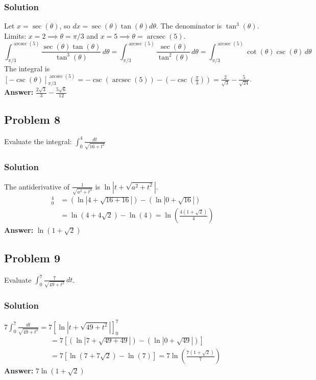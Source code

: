 \documentclass{article}
\begin{document}
\subsubsection*{Solution}
Let $ x = \sec(\theta) $, so $ dx = \sec(\theta)\tan(\theta)d\theta $. The denominator is $ \tan^3(\theta) $.
Limits: $ x=2 \implies \theta = \pi/3 $ and $ x=5 \implies \theta = \operatorname{arcsec}(5) $.
\[ \int_{\pi/3}^{\operatorname{arcsec}(5)} \frac{\sec(\theta)\tan(\theta)}{\tan^3(\theta)} \,d\theta = \int_{\pi/3}^{\operatorname{arcsec}(5)} \frac{\sec(\theta)}{\tan^2(\theta)} \,d\theta = \int_{\pi/3}^{\operatorname{arcsec}(5)} \cot(\theta)\csc(\theta) \,d\theta \]
The integral is $ [-\csc(\theta)]_{\pi/3}^{\operatorname{arcsec}(5)} = -\csc(\operatorname{arcsec}(5)) - (-\csc(\frac{\pi}{3})) = \frac{2}{\sqrt{3}} - \frac{5}{\sqrt{24}} $.
\textbf{Answer:} $ \frac{2\sqrt{3}}{3} - \frac{5\sqrt{6}}{12} $


\subsection{Problem 8}
Evaluate the integral: $ \int_{0}^{4} \frac{dt}{\sqrt{16 + t^2}} $
\subsubsection*{Solution}
The antiderivative of $ \frac{1}{\sqrt{a^2 + t^2}} $ is $ \ln|t + \sqrt{a^2 + t^2}| $.
\begin{align*}
[\ln|t + \sqrt{16 + t^2}|]_{0}^{4} &= (\ln|4 + \sqrt{16 + 16}|) - (\ln|0 + \sqrt{16}|) \\
&= \ln(4 + 4\sqrt{2}) - \ln(4) = \ln\left(\frac{4(1 + \sqrt{2})}{4}\right)
\end{align*}
\textbf{Answer:} $ \ln(1 + \sqrt{2}) $


\subsection{Problem 9}
Evaluate $ \int_{0}^{7} \frac{7}{\sqrt{49 + t^2}} \,dt $.
\subsubsection*{Solution}
$ 7 \int_{0}^{7} \frac{dt}{\sqrt{49 + t^2}} = 7 [\ln|t + \sqrt{49 + t^2}|]_{0}^{7} $
\begin{align*}
&= 7 [(\ln|7 + \sqrt{49+49}|) - (\ln|0 + \sqrt{49}|)] \\
&= 7 [\ln(7 + 7\sqrt{2}) - \ln(7)] = 7 \ln\left(\frac{7(1+\sqrt{2})}{7}\right)
\end{align*}
\textbf{Answer:} $ 7 \ln(1 + \sqrt{2}) $
\end{document}
